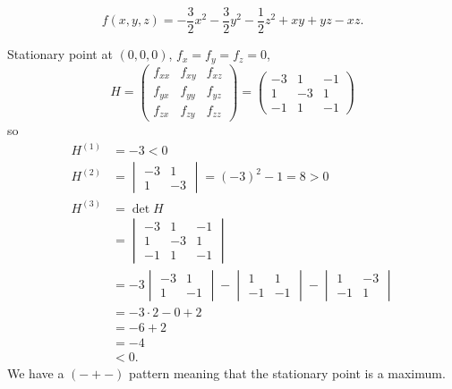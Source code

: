 \documentclass[10pt, a4paper]{article}
\begin{document}
\begin{example}
    \[
    f(x, y, z) = -\frac{3}{2}x ^ 2 - \frac{3}{2}y ^ 2 - \frac{1}{2}z ^ 2 + xy + yz - xz.
    \]

    \begin{solution}
        Stationary point at $(0, 0, 0)$,
        $f_x = f_y = f_z = 0$,
        \[
        H = \begin{pmatrix}
            f_{xx} & f_{xy} & f_{xz} \\
            f_{yx} & f_{yy} & f_{yz} \\
            f_{zx} & f_{zy} & f_{zz}
        \end{pmatrix} = \begin{pmatrix}
            -3 & 1 & -1 \\
            1 & -3 & 1 \\
            -1 & 1 & -1
        \end{pmatrix}
        \]
        so
        \begin{align*}
            H ^ {(1)} &= -3 < 0 \\
            H ^ {(2)} &= \begin{vmatrix}
                -3 & 1 \\ 1 & -3
            \end{vmatrix} = (-3) ^ 2 - 1 = 8 > 0 \\
            H ^ {(3)} &= \det{H} \\
            &= \begin{vmatrix}
                -3 & 1 & - 1 \\
                1 & -3 & 1 \\
                -1 & 1 & -1
            \end{vmatrix} \\
            &= -3\begin{vmatrix}
                -3 & 1 \\ 1 & -1
            \end{vmatrix} - \begin{vmatrix}
                1 & 1 \\ -1 & -1
            \end{vmatrix} - \begin{vmatrix}
                1 & -3 \\ -1 & 1
            \end{vmatrix} \\
            &= -3 \cdot 2 - 0 + 2 \\
            &= -6 + 2 \\
            &= -4 \\
            &< 0.
        \end{align*}
        We have a $(-+-)$ pattern meaning that the stationary point is a maximum.
    \end{solution}
\end{example}
\end{document}
